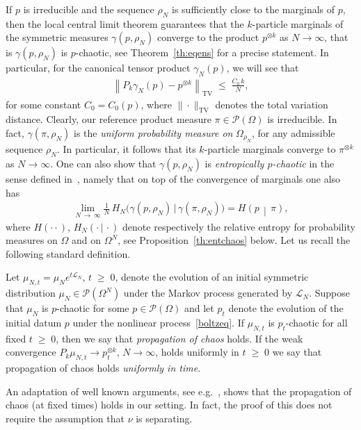\documentclass[AHL,Unicode,longabstracts,published]{cedram}
\renewcommand{\leq}{\;\leqslant\;}
\renewcommand{\geq}{\;\geqslant\;}
\newcommand{\Om}{\Omega}
\newcommand{\tc}{\, |\, }
\newcommand{\tv}{\mathrm{TV}}
\newcommand{\cL}{\mathcal{L}}
\newcommand{\cP}{\mathcal{P}}
\let\g=\gamma
\let\r=\rho
\let\O=\Omega
\begin{document}
If $p$ is irreducible and the sequence $\r_N$ is sufficiently close to the marginals of $p$, then the local central limit theorem guarantees that the $k$-particle marginals of the symmetric measures $\gamma(p,\r_N)$ converge to the product $p^{\otimes k}$ as $N\to\infty$, that is $\gamma(p,\r_N)$ is $p$-chaotic, see Theorem~\ref{th:eqens} for a precise statement. In particular, for the canonical tensor product $\g_N(p)$, we will see that
\begin{align}\label{eq:chaos0}
\left\|P_k\g_N(p)-p^{\otimes k}\right\|_\tv \leq \frac{C_0\,k}{N},
\end{align}
for some constant $C_0=C_0(p)$, where $\|\cdot \|_\tv$ denotes the total variation distance. Clearly, our reference product measure $\pi\in\cP(\O)$ is irreducible. In fact, $\gamma(\pi,\r_N)$ is the \emph{uniform probability measure on} $\Om_{\r_N}$, for any admissible sequence $\r_N$. In particular, it follows that its $k$-particle marginals converge to $\pi^{\otimes k}$ as $N\to\infty$. One can also show that $\gamma(p,\r_N)$ is \emph{entropically $p$-chaotic} in the sense defined in~\cite{entfound}, namely that on top of the convergence of marginals one also has
\begin{align}\label{entropicchaos}
\lim_{N\,\to\,\infty} \frac1N\,H_N\big(\gamma(p,\r_N)\,\big|\,  \gamma(\pi,\r_N)\big)=H\left(p\,\middle|\, \pi\right),
\end{align}
where $H(\cdot\cdot)$, $H_N(\cdot\tc\cdot)$ denote respectively the relative entropy for probability measures on $\O$ and on $\O^N$, see Proposition~\ref{th:entchaos} below. Let us recall the following standard definition.

\begin{defi}\label{kacschaosprop}
Let $\mu_{N,t}=\mu_{N}e^{t\cL_N}$, $t\geq 0$, denote the evolution of an initial symmetric distribution $\mu_{N}\in\cP(\O^N)$ under the Markov process generated by $\cL_N$. Suppose that $\mu_{N}$ is $p$-chaotic for some $p\in\cP(\O)$ and let $p_t$ denote the evolution of the initial datum $p$ under the nonlinear process~\eqref{boltzeq}. If $\mu_{N,t}$ is $p_t$-chaotic for all fixed $t\geq 0$, then we say that \emph{propagation of chaos} holds. If the weak convergence $P_k\mu_{N,t}\longrightarrow p_t^{\otimes k}$, $N\to\infty$, holds uniformly in $t\geq 0$ we say that propagation of chaos holds \emph{uniformly in time}.
\end{defi}

An adaptation of well known arguments, see e.g.~\cite{KAC,sznitman}, shows that the propagation of chaos (at fixed times) holds in our setting. In fact, the proof of this does not require the assumption that $\nu$ is separating.
\end{document}
